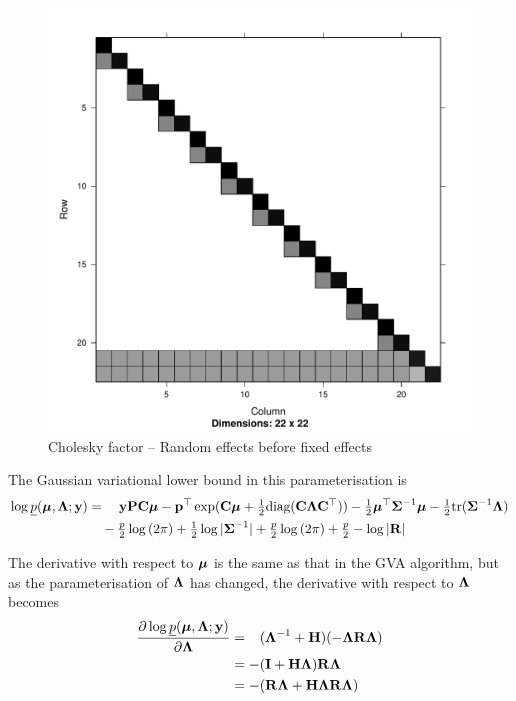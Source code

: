\documentclass[times, doublespace]{anzsauth}
\begin{document}
	\begin{figure}[p]
		\includegraphics[scale=.25]{mZ_mX_cholesky.pdf}
		\caption{\tiny Cholesky factor -- Random effects before fixed effects}
	\end{figure}
	
	\noindent The Gaussian variational lower bound in this parameterisation is
	\begin{align*}
		\log \underline{p}({\boldsymbol \mu}, {\boldsymbol \Lambda}; {\bf y}) & = \quad {\bf y}{\bf P}{\bf C} {\boldsymbol\mu} - {\bf p}^\top \exp({\bf C} {\boldsymbol \mu} + \tfrac{1}{2} \text{diag}({\bf C} {\boldsymbol \Lambda} {\bf C}^\top)) - \tfrac{1}{2} {\boldsymbol \mu}^\top {\boldsymbol\Sigma}^{-1} {\boldsymbol \mu} - \tfrac{1}{2} \text{tr}{({\boldsymbol\Sigma}^{-1} {\boldsymbol\Lambda})} \\
		                                        & \quad- \tfrac{p}{2} \log{(2 \pi)} + \tfrac{1}{2} \log{|{\boldsymbol\Sigma}^{-1}|} + \tfrac{p}{2} \log{(2 \pi)} + \tfrac{p}{2} - \log{|{\bf R}|}                                             
	\end{align*}
	
	\noindent The derivative with respect to ${\boldsymbol \mu}$ is the same as that in the GVA algorithm, but as the parameterisation of
	${\boldsymbol \Lambda}$ has changed, the  derivative with respect to ${\boldsymbol \Lambda}$ becomes
	\begin{align*}
		\frac{\partial \log \underline{p}({\boldsymbol \mu}, {\boldsymbol \Lambda}; {\bf y})}{\partial {\boldsymbol\Lambda}}
		  & = \hphantom{-}({\boldsymbol \Lambda}^{-1} + {\bf H})(-{\boldsymbol \Lambda} {\bf R} {\boldsymbol \Lambda}) \\
		  & = -({\bf I} + {\bf H}{\boldsymbol \Lambda}){\bf R}{\boldsymbol \Lambda}                           \\
		  & = - ({\bf R}{\boldsymbol \Lambda} + {\bf H}{\boldsymbol \Lambda}{\bf R}{\boldsymbol \Lambda})                  
	\end{align*} 
	
\end{document}
